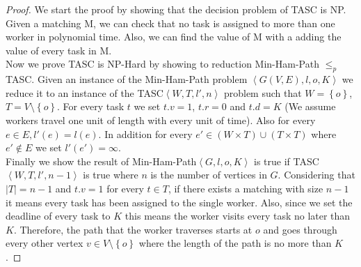 \begin{proof}
We start the proof by showing that the decision problem of TASC is NP. Given a matching M, we can check that no task is assigned to more than one worker in polynomial time. Also, we can find the value of M with a adding the value of every task in M.\\

Now we prove TASC is NP-Hard by showing to reduction Min-Ham-Path $\leq_p$ TASC. Given an instance of the Min-Ham-Path problem $\left\langle G(V,E), l, o, K \right\rangle$ we reduce it to an instance of the TASC$\left\langle W, T, l', n \right\rangle$ problem such that $W = \left\{ o \right\}$, $T = V \setminus \left\{ o \right\}$. For every task $t$ we set $t.v = 1$, $t.r = 0$ and $t.d = K$ (We assume workers travel one unit of length with every unit of time). Also for every $e \in E, l'(e) = l(e)$. In addition for every $e' \in \left( W \times T \right) \cup \left( T \times T \right) $ where $e' \not\in E$ we set $l'(e') = \infty$.\\ 

Finally we show the result of Min-Ham-Path$\left\langle G, l, o, K \right\rangle$ is true if TASC$\left\langle W, T, l', n-1 \right\rangle$ is true where $n$ is the number of vertices in $G$. Considering that $\left\vert T \right\vert = n - 1$ and $t.v = 1$ for every $t \in T$, if there exists a matching with size $n - 1$ it means every task has been assigned to the single worker. Also, since we set the deadline of every task to $K$ this means the worker visits every task no later than $K$. Therefore, the path that the worker traverses starts at $o$ and goes through every other vertex $v \in V \setminus \left\{ o \right\}$ where the length of the path is no more than $K$.
\end{proof}